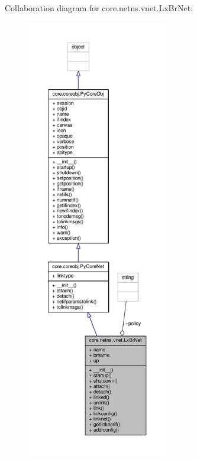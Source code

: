 Collaboration diagram for core.\+netns.\+vnet.\+Lx\+Br\+Net\+:
\nopagebreak
\begin{figure}[H]
\begin{center}
\leavevmode
\includegraphics[height=550pt]{classcore_1_1netns_1_1vnet_1_1_lx_br_net__coll__graph}
\end{center}
\end{figure}
